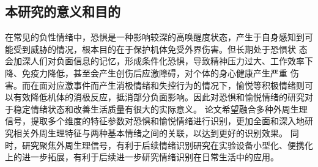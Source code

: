 \subsection{本研究的意义和目的}
在常见的负性情绪中，恐惧是一种影响较深的高唤醒度状态\cite{James1884}，产生于自身感知到可能受到威胁的情况，根本目的在于保护机体免受外界伤害。但长期处于恐惧状
态会加深人们对负面信息的记忆，形成条件化恐惧，导致精神压力过大、工作效率下降、免疫力降低，甚至会产生创伤后应激障碍，对个体的身心健康产生严重
伤害。而在面对应激事件而产生消极情绪和失控行为的情况下，愉悦等积极情绪则可以有效降低机体的消极反应，抵消部分负面影响。因此对恐惧和愉悦情绪的研究对于稳定情绪状态和改善生活质量有很大的实际意义。
论文希望融合多种外周生理信号，提取多个维度的特征参数对恐惧和愉悦情绪进行识别，更加全面和深入地研究相关外周生理特征与两种基本情绪之间的关联，以达到更好的识别效果。
同时，研究聚焦外周生理信号，有利于后续情绪识别研究在实验设备小型化、便携化上的进一步拓展，有利于后续进一步研究情绪识别在日常生活中的应用。
